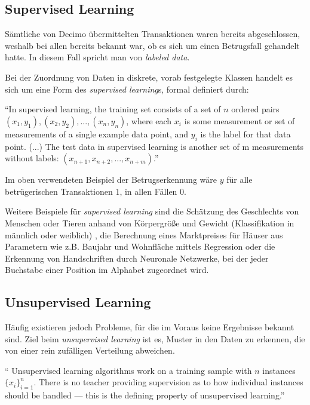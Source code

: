 \documentclass[runningheads,a4paper]{llncs}
\begin{document}
\subsection{Supervised Learning}

Sämtliche von Decimo übermittelten Transaktionen waren bereits abgeschlossen, weshalb bei allen bereits bekannt war, ob es sich um einen Betrugsfall gehandelt hatte. In diesem Fall spricht man von \emph{labeled data}.

Bei der Zuordnung von Daten in diskrete, vorab festgelegte Klassen handelt es sich um eine Form des \emph{supervised learning}s, formal definiert durch:

\enquote{In supervised learning, the training set consists of a set of $n$ ordered pairs $(x_1, y_1),(x_2, y_2), ...,(x_n, y_n)$, where each $x_i$ is some measurement or set of measurements of a single example data point, and $y_i$ is the label for that data point. (...) The test data in supervised learning is another set of m measurements without
labels: $(x_{n+1}, x_{n+2}, ..., x_{n+m})$.} \cite{miller}

Im oben verwendeten Beispiel der Betrugserkennung wäre $y$ für alle betrügerischen Transaktionen $1$, in allen Fällen $0$.

Weitere Beispiele für \emph{supervised learning} sind die Schätzung des Geschlechts von Menschen oder Tieren anhand von Körpergröße und Gewicht (Klassifikation in männlich oder weiblich) \cite{zhu_goldberg_2009}, die Berechnung eines Marktpreises für Häuser aus Parametern wie z.B. Baujahr und Wohnfläche mittels Regression \cite{Coursera} oder die Erkennung von Handschriften durch Neuronale Netzwerke, bei der jeder Buchstabe einer Position im Alphabet zugeordnet wird.




\subsection{Unsupervised Learning}

Häufig existieren jedoch Probleme, für die im Voraus keine Ergebnisse bekannt sind. Ziel beim \emph{unsupervised learning} ist es, Muster in den Daten zu erkennen, die von einer rein zufälligen Verteilung abweichen\cite{Ghahramani04unsupervisedlearning}.

\enquote{ Unsupervised learning algorithms work on a training sample with $n$ instances $\{x_i\}_{i=1}^n$. There is no teacher providing supervision as to how individual instances should be handled — this is the defining property of unsupervised learning.}\cite{zhu_goldberg_2009}
\end{document}
